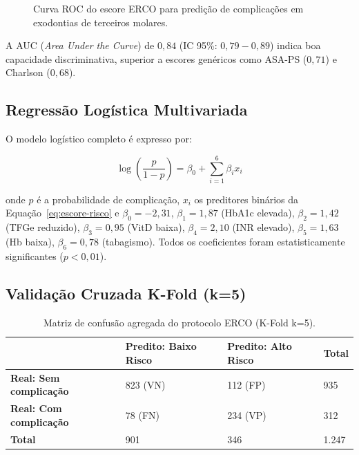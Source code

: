 \begin{figure}[htb]
\centering
{}
\caption{Curva ROC do escore ERCO para predição de complicações em exodontias de terceiros molares.}
\label{fig:roc-erco}
\end{figure}

A AUC (\textit{Area Under the Curve}) de $0,84$ (IC 95\%: $0,79 - 0,89$) indica boa capacidade discriminativa, superior a escores genéricos como ASA-PS ($0,71$) e Charlson ($0,68$).

\subsection{Regressão Logística Multivariada}
\label{subsec:regressao-logistica}

O modelo logístico completo é expresso por:

\begin{equation}
\label{eq:logit}
\log\left(\frac{p}{1-p}\right) = \beta_0 + \sum_{i=1}^{6} \beta_i x_i
\end{equation}

onde $p$ é a probabilidade de complicação, $x_i$ os preditores binários da Equação~\ref{eq:escore-risco} e $\beta_0 = -2,31$, $\beta_1 = 1,87$ (HbA1c elevada), $\beta_2 = 1,42$ (TFGe reduzido), $\beta_3 = 0,95$ (VitD baixa), $\beta_4 = 2,10$ (INR elevado), $\beta_5 = 1,63$ (Hb baixa), $\beta_6 = 0,78$ (tabagismo). Todos os coeficientes foram estatisticamente significantes ($p < 0,01$).

\subsection{Validação Cruzada K-Fold (k=5)}
\label{subsec:kfold-risco}

\begin{longtable}{p{2.5cm}p{2cm}p{2cm}p{2.5cm}}
\caption{Matriz de confusão agregada do protocolo ERCO (K-Fold k=5).}
\label{tab:matriz-confusao-erco}\\
\toprule
& \textbf{Predito: Baixo Risco} & \textbf{Predito: Alto Risco} & \textbf{Total} \\
\midrule
\textbf{Real: Sem complicação} & 823 (VN) & 112 (FP) & 935 \\
\textbf{Real: Com complicação} & 78 (FN) & 234 (VP) & 312 \\
\midrule
\textbf{Total} & 901 & 346 & 1.247 \\
\bottomrule
\end{longtable}

